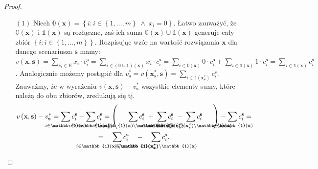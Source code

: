 \begin{proof}
	\begin{itemize}
		\item[$\left( 1 \right)$] Niech $\mathbb{0} \left( \textbf{x} \right) = \left\{ i : i \in \left\{ 1, \dots, m \right\} \; \wedge \; x_{i} = 0 \right\}$. Łatwo zauważyć, że $\mathbb{0} \left( \textbf{x} \right)$ i $\mathbb{1} \left( \textbf{x} \right)$ są rozłączne, zaś ich suma $\mathbb{0} \left( \textbf{x} \right) \cup \mathbb{1} \left( \textbf{x} \right)$ generuje cały zbiór $\left\{ i : i \in \left\{ 1, \dots, m \right\} \right\}$. Rozpisując wzór na wartość rozwiązania $\textbf{x}$ dla danego scenariusza $\textbf{s}$ mamy: $v \left( \textbf{x}, \textbf{s} \right) = \sum_{e_{i} \in E} x_{i} \cdot c^{\textbf{s}}_{i} = \sum_{i \in \left( \mathbb{0} \cup \mathbb{1} \right) \left( \textbf{x} \right)} x_{i} \cdot c^{\textbf{s}}_{i} = \sum_{i \in \mathbb{0} \left( \textbf{x} \right)} 0 \cdot c^{\textbf{s}}_{i} + \sum_{i \in \mathbb{1} \left( \textbf{x} \right)} 1 \cdot c^{\textbf{s}}_{i} = \sum_{i \in \mathbb{1} \left( \textbf{x} \right)} c^{\textbf{s}}_{i}$. Analogicznie możemy postąpić dla $v^{\ast}_{\textbf{s}} = v \left( \textbf{x}^{\ast}_{\textbf{s}}, \textbf{s} \right) = \sum_{i \in \mathbb{1} \left( \textbf{x}^{\ast}_{\textbf{s}} \right)} c^{\textbf{s}}_{i}$. Zauważmy, że w wyrażeniu $v \left( \textbf{x}, \textbf{s} \right) - v^{\ast}_{\textbf{s}}$ wszystkie elementy sumy, które należą do obu zbiorów, zredukują się tj.
		\begin{gather*}
			v \left( \textbf{x}, \textbf{s} \right) - v^{\ast}_{\textbf{s}} = \sum_{\mathclap{i \in \mathbb{1} \left( \textbf{x} \right)}} c^{\textbf{s}}_{i} - \sum_{\mathclap{i \in \mathbb{1} \left( \textbf{x}^{\ast}_{\textbf{s}} \right)}} c^{\textbf{s}}_{i} = \left( \quad \; \; \sum_{\mathclap{i \in \mathbb{1} \left( \textbf{x} \right) \setminus \mathbb{1} \left( \textbf{x}^{\ast}_{\textbf{s}} \right) }} c^{\textbf{s}}_{i} \; + \; \sum_{\mathclap{i \in \mathbb{1} \left( \textbf{x}^{\ast}_{\textbf{s}} \right) }} c^{\textbf{s}}_{i} \; - \; \sum_{\mathclap{i \in \mathbb{1} \left( \textbf{x}^{\ast}_{\textbf{s}} \right) \setminus \mathbb{1} \left( \textbf{x} \right) }} c^{\textbf{s}}_{i} \quad \; \; \right) - \sum_{\mathclap{i \in \mathbb{1} \left( \textbf{x} \right) }} c^{\textbf{s}}_{i} = \\ = \quad \sum_{\mathclap{i \in \mathbb{1} \left( \textbf{x} \right) \setminus \mathbb{1} \left( \textbf{x}^{\ast}_{\textbf{s}} \right) }} c^{\textbf{s}}_{i} \quad - \quad \sum_{\mathclap{i \in \mathbb{1} \left( \textbf{x}^{\ast}_{\textbf{s}} \right) \setminus \mathbb{1} \left( \textbf{x} \right) }} c^{\textbf{s}}_{i}\text{.}

\end{gather*}
\end{itemize}
\end{proof}
